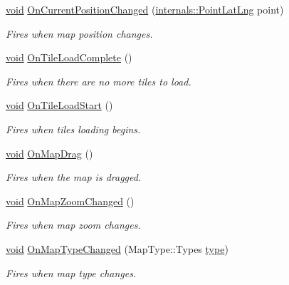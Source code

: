 \begin{DoxyCompactItemize}
\hyperlink{group___u_a_v_objects_plugin_ga444cf2ff3f0ecbe028adce838d373f5c}{void} \hyperlink{group___o_p_map_widget_ga15064d97d2715398719dd78fccb07a39}{On\-Current\-Position\-Changed} (\hyperlink{structinternals_1_1_point_lat_lng}{internals\-::\-Point\-Lat\-Lng} point)
\begin{DoxyCompactList}\small\item\em Fires when map position changes. \end{DoxyCompactList}\item 
\hyperlink{group___u_a_v_objects_plugin_ga444cf2ff3f0ecbe028adce838d373f5c}{void} \hyperlink{group___o_p_map_widget_ga5cffbc0b6973aa0d25c7a8e3cb9a10bd}{On\-Tile\-Load\-Complete} ()
\begin{DoxyCompactList}\small\item\em Fires when there are no more tiles to load. \end{DoxyCompactList}\item 
\hyperlink{group___u_a_v_objects_plugin_ga444cf2ff3f0ecbe028adce838d373f5c}{void} \hyperlink{group___o_p_map_widget_gab28c7ce093c06e3dd06d7981fa34abde}{On\-Tile\-Load\-Start} ()
\begin{DoxyCompactList}\small\item\em Fires when tiles loading begins. \end{DoxyCompactList}\item 
\hyperlink{group___u_a_v_objects_plugin_ga444cf2ff3f0ecbe028adce838d373f5c}{void} \hyperlink{group___o_p_map_widget_ga0985006355718a5c61bfd02c70e6b0aa}{On\-Map\-Drag} ()
\begin{DoxyCompactList}\small\item\em Fires when the map is dragged. \end{DoxyCompactList}\item 
\hyperlink{group___u_a_v_objects_plugin_ga444cf2ff3f0ecbe028adce838d373f5c}{void} \hyperlink{group___o_p_map_widget_ga6cff965989ae7d23b98d5345c3912492}{On\-Map\-Zoom\-Changed} ()
\begin{DoxyCompactList}\small\item\em Fires when map zoom changes. \end{DoxyCompactList}\item 
\hyperlink{group___u_a_v_objects_plugin_ga444cf2ff3f0ecbe028adce838d373f5c}{void} \hyperlink{group___o_p_map_widget_gad0bd8494b0fba444bad76bcf3c1bdb0a}{On\-Map\-Type\-Changed} (Map\-Type\-::\-Types \hyperlink{glext_8h_a7d05960f4f1c1b11f3177dc963a45d86}{type})
\begin{DoxyCompactList}\small\item\em Fires when map type changes. \end{DoxyCompactList}\item 

\end{DoxyCompactItemize}
